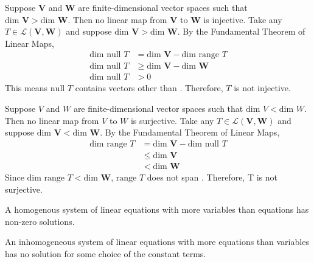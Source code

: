 \documentclass[11pt]{article} %
\newcommand\V{\text{$\mathbf{V}$}}
\newcommand\W{\text{$\mathbf{W}$}}
\newcommand\0{\text{$\mathbf{0}$}}
\renewcommand\L[2]{\mathcal{L}(#1,#2)}
\renewcommand\dim{\text{dim }}
\renewcommand\null{\text{null }}
\newcommand\range{\text{range }}
\begin{document}
{Suppose $\V$ and $\W$ are finite-dimensional vector spaces such that $\dim \V > \dim \W$. Then no linear map from $\V$ to $\W$ is injective.}
{
Take any $T \in \L{\V}{\W}$ and suppose $\dim \V > \dim \W$. By the Fundamental Theorem of Linear Maps,
\begin{align*}
\dim \null T &= \dim \V - \dim \range T\\
\dim \null T &\ge \dim \V - \dim \W\\
\dim \null T &> 0
\end{align*}
This means $\null T$ contains vectors other than \0. Therefore, $T$ is not injective.
}

{Suppose $V$ and $W$ are finite-dimensional vector spaces such that $\dim V < \dim W$. Then no linear map from $V$ to $W$ is surjective.}
{
Take any $T \in \L{\V}{\W}$ and suppose $\dim \V < \dim \W$. By the Fundamental Theorem of Linear Maps,
\begin{align*}
\dim \range T &= \dim \V - \dim \null T \\
&\le \dim \V \\
&< \dim \W
\end{align*}
Since $\dim \range T < \dim \W$, $\range T$ does not span \W. Therefore, T is not surjective.
}

{A homogenous system of linear equations with more variables than equations has non-zero solutions.}
{}

{An inhomogeneous system of linear equations with more equations than variables has no solution for some choice of the constant terms.}
{}

\newpage

\end{document}
